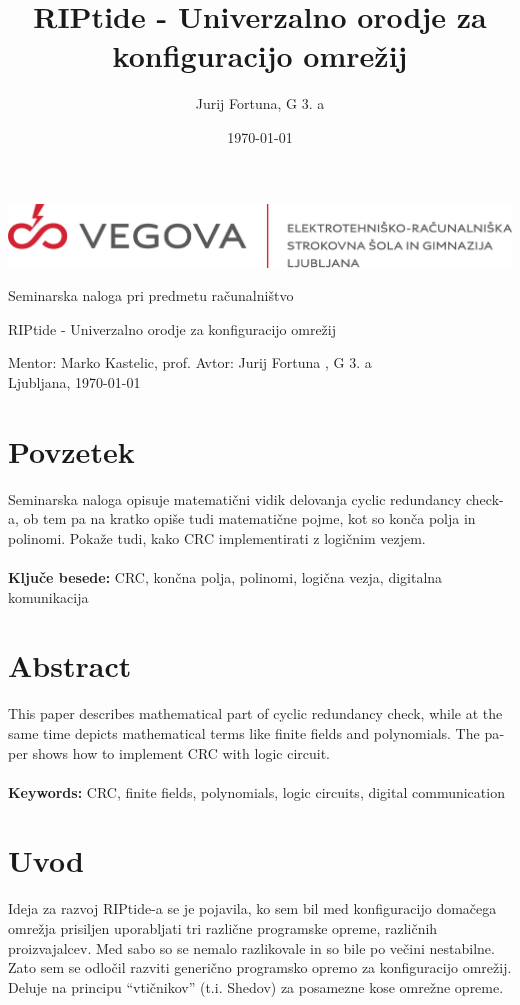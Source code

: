 \documentclass[12pt]{article}
\title{RIPtide - Univerzalno orodje za konfiguracijo omrežij}
\author{Jurij Fortuna, G 3. a}
\date{\MMYYYYdate\today}
\begin{document}
\begin{center}
    \thispagestyle{empty}
    \includegraphics[scale=1]{slike/vegova.png}
    
    \vspace{\fill} 
    Seminarska naloga pri predmetu računalništvo

    \Huge{RIPtide - Univerzalno orodje za konfiguracijo omrežij}

    \normalsize
    \vspace{\fill}

    Mentor: Marko Kastelic, prof. \hfill Avtor: Jurij Fortuna , G 3. a\\
    \null
    Ljubljana, \MMYYYYdate\today
\end{center}
\newpage

\section*{Povzetek}
Seminarska naloga opisuje matematični vidik delovanja cyclic redundancy check-a,
ob tem pa na kratko opiše tudi matematične pojme, kot so konča polja in polinomi.
Pokaže tudi, kako CRC implementirati z logičnim vezjem.\\
\\
\textbf{Ključe besede:} CRC, končna polja, polinomi, logična vezja, digitalna
komunikacija\\

\section*{Abstract}
\foreignlanguage{english}{
	This paper describes mathematical part of cyclic 
	redundancy check, while at the same time depicts mathematical terms like finite
	fields and polynomials. The paper shows how to implement CRC with logic circuit.\\
	\\
	\textbf{Keywords:} CRC, finite fields, polynomials, logic circuits, digital 
	communication
}
\newpage

\tableofcontents
\newpage

\section{Uvod}
Ideja za razvoj RIPtide-a se je pojavila, ko sem bil med konfiguracijo domačega omrežja prisiljen uporabljati tri različne programske opreme, različnih proizvajalcev. Med sabo so se nemalo razlikovale in so bile po večini nestabilne. Zato sem se odločil razviti generično programsko opremo za konfiguracijo omrežij. Deluje na principu “vtičnikov” (t.i. Shedov) za posamezne kose omrežne opreme.
\newpage
\end{document}
